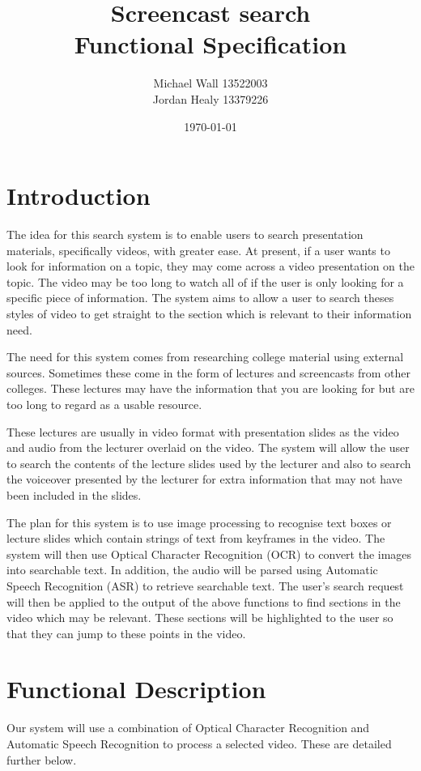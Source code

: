 \documentclass[a4paper,12pt]{article}
\title{Screencast search\\Functional Specification}
\author{Michael Wall 13522003\\Jordan Healy 13379226}
\date{\today}
\begin{document}
\maketitle
\newpage

\tableofcontents

\newpage

\section{Introduction}
The idea for this search system is to enable users to search presentation materials, specifically videos, with greater ease. At present, if a user wants to look for information on a topic, they may come across a video presentation on the topic. The video may be too long to watch all of if the user is only looking for a specific piece of information. The system aims to allow a user to search theses styles of video to get straight to the section which is relevant to their information need.

The need for this system comes from researching college material using external sources. Sometimes these come in the form of lectures and screencasts from other colleges. These lectures may have the information that you are looking for but are too long to regard as a usable resource.

These lectures are usually in video format with presentation slides as the video and audio from the lecturer overlaid on the video. The system will allow the user to search the contents of the lecture slides used by the lecturer and also to search the voiceover presented by the lecturer for extra information that may not have been included in the slides.

The plan for this system is to use image processing to recognise text boxes or lecture slides which contain strings of text from keyframes in the video. The system will then use Optical Character Recognition (OCR) to convert the images into searchable text. In addition, the audio will be parsed using Automatic Speech Recognition (ASR) to retrieve searchable text. The user’s search request will then be applied to the output of the above functions to find sections in the video which may be relevant. These sections will be highlighted to the user so that they can jump to these points in the video.

\section{Functional Description}
Our system will use a combination of Optical Character Recognition and Automatic Speech Recognition to process a selected video. These are detailed further below.
\end{document}
